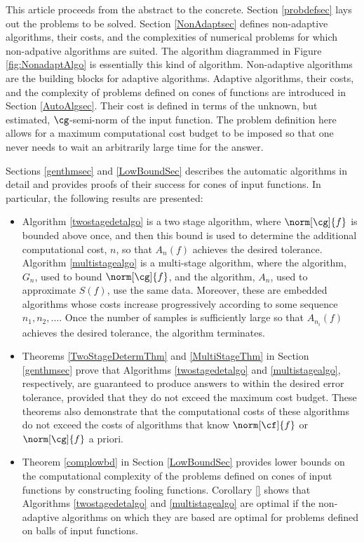 \documentclass[]{elsarticle}
\theoremstyle{definition}
\theoremstyle{remark}
\begin{document}
This article proceeds from the abstract to the concrete.  Section \ref{probdefsec} lays out the problems to be solved.  Section \ref{NonAdaptsec} defines non-adaptive algorithms, their costs, and the complexities of numerical problems for which non-adpative algorithms are suited.  The algorithm diagrammed in Figure \ref{fig:NonadaptAlgo} is essentially this kind of algorithm.  Non-adaptive algorithms are the building blocks for adaptive algorithms.  Adaptive algorithms, their costs, and the complexity of problems defined on cones of functions are introduced in Section \ref{AutoAlgsec}.  Their cost is defined in terms of the unknown, but estimated, $\cg$-semi-norm of the input function.  The problem definition here allows for a maximum computational cost budget to be imposed so that one never needs to wait an arbitrarily large time for the answer.  

Sections \ref{genthmsec} and \ref{LowBoundSec} describes the automatic algorithms in detail and provides proofs of their success for cones of input functions.  In particular, the following results are presented:
\begin{itemize}

\item Algorithm \ref{twostagedetalgo} is a two stage algorithm, where $\norm[\cg]{f}$ is bounded above once, and then this bound is used to determine the additional computational cost, $n$, so that $A_n(f)$ achieves the desired tolerance. Algorithm \ref{multistagealgo} is a multi-stage algorithm, where the algorithm, $G_n$, used to bound $\norm[\cg]{f}$, and the algorithm, $A_n$, used to approximate $S(f)$, use the same data. Moreover, these are embedded algorithms whose costs increase progressively according to some sequence $n_1, n_2, \ldots$.  Once the number of samples is sufficiently large so that $A_{n_i}(f)$ achieves the desired tolerance, the algorithm terminates.

\item Theorems \ref{TwoStageDetermThm} and \ref{MultiStageThm} in Section \ref{genthmsec} prove that Algorithms \ref{twostagedetalgo} and \ref{multistagealgo}, respectively, are guaranteed to produce answers to within the desired error tolerance, provided that they do not exceed the maximum cost budget.  These theorems also demonstrate that the computational costs of these algorithms do not exceed the costs of algorithms that know $\norm[\cf]{f}$ or $\norm[\cg]{f}$ a priori.

\item Theorem \ref{complowbd} in Section \ref{LowBoundSec} provides lower bounds on the computational complexity of the problems defined on cones of input functions by constructing fooling functions.  Corollary \ref{} shows that Algorithms \ref{twostagedetalgo} and \ref{multistagealgo} are optimal if the non-adaptive algorithms on which they are based are optimal for problems defined on balls of input functions.

\end{itemize}
\end{document}
